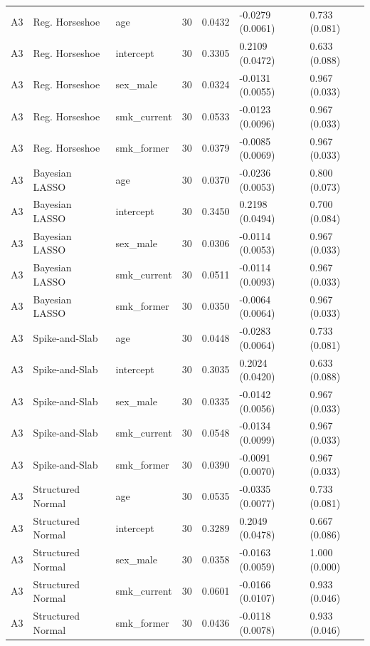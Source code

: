 \begin{tabular}{lllrlll}
  A3 & Reg. Horseshoe & age &  30 & 0.0432 & -0.0279 (0.0061) & 0.733 (0.081) \\ 
  A3 & Reg. Horseshoe & intercept &  30 & 0.3305 & 0.2109 (0.0472) & 0.633 (0.088) \\ 
  A3 & Reg. Horseshoe & sex\_male &  30 & 0.0324 & -0.0131 (0.0055) & 0.967 (0.033) \\ 
  A3 & Reg. Horseshoe & smk\_current &  30 & 0.0533 & -0.0123 (0.0096) & 0.967 (0.033) \\ 
  A3 & Reg. Horseshoe & smk\_former &  30 & 0.0379 & -0.0085 (0.0069) & 0.967 (0.033) \\ 
  A3 & Bayesian LASSO & age &  30 & 0.0370 & -0.0236 (0.0053) & 0.800 (0.073) \\ 
  A3 & Bayesian LASSO & intercept &  30 & 0.3450 & 0.2198 (0.0494) & 0.700 (0.084) \\ 
  A3 & Bayesian LASSO & sex\_male &  30 & 0.0306 & -0.0114 (0.0053) & 0.967 (0.033) \\ 
  A3 & Bayesian LASSO & smk\_current &  30 & 0.0511 & -0.0114 (0.0093) & 0.967 (0.033) \\ 
  A3 & Bayesian LASSO & smk\_former &  30 & 0.0350 & -0.0064 (0.0064) & 0.967 (0.033) \\ 
  A3 & Spike-and-Slab & age &  30 & 0.0448 & -0.0283 (0.0064) & 0.733 (0.081) \\ 
  A3 & Spike-and-Slab & intercept &  30 & 0.3035 & 0.2024 (0.0420) & 0.633 (0.088) \\ 
  A3 & Spike-and-Slab & sex\_male &  30 & 0.0335 & -0.0142 (0.0056) & 0.967 (0.033) \\ 
  A3 & Spike-and-Slab & smk\_current &  30 & 0.0548 & -0.0134 (0.0099) & 0.967 (0.033) \\ 
  A3 & Spike-and-Slab & smk\_former &  30 & 0.0390 & -0.0091 (0.0070) & 0.967 (0.033) \\ 
  A3 & Structured Normal & age &  30 & 0.0535 & -0.0335 (0.0077) & 0.733 (0.081) \\ 
  A3 & Structured Normal & intercept &  30 & 0.3289 & 0.2049 (0.0478) & 0.667 (0.086) \\ 
  A3 & Structured Normal & sex\_male &  30 & 0.0358 & -0.0163 (0.0059) & 1.000 (0.000) \\ 
  A3 & Structured Normal & smk\_current &  30 & 0.0601 & -0.0166 (0.0107) & 0.933 (0.046) \\ 
  A3 & Structured Normal & smk\_former &  30 & 0.0436 & -0.0118 (0.0078) & 0.933 (0.046) \\ 
   \hline
\end{tabular}
